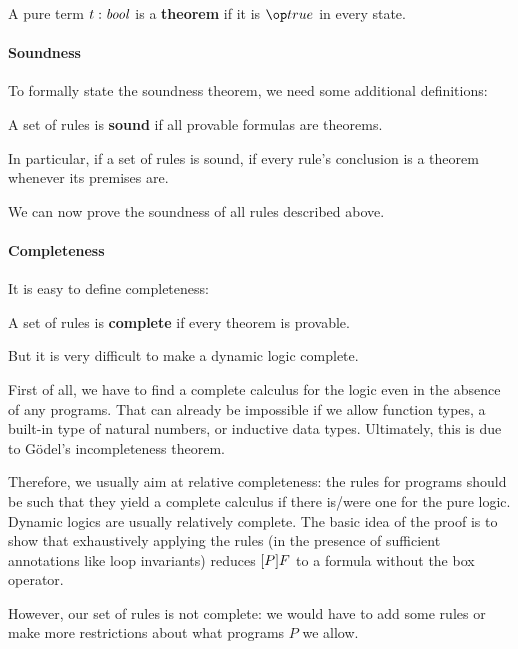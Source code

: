 \begin{definition}[Theorem]
A pure term $t:\mathit{bool}$ is a \textbf{theorem} if it is $\true$ in every state.
\end{definition}


\paragraph{Soundness}
To formally state the soundness theorem, we need some additional definitions:

\begin{definition}[Soundness]
A set of rules is \textbf{sound} if all provable formulas are theorems.
\end{definition}

In particular, if a set of rules is sound, if every rule's conclusion is a theorem whenever its premises are.

We can now prove the soundness of all rules described above.

\paragraph{Completeness}

It is easy to define completeness:

\begin{definition}[Completeness]
A set of rules is \textbf{complete} if every theorem is provable.
\end{definition}

But it is very difficult to make a dynamic logic complete.

First of all, we have to find a complete calculus for the logic even in the absence of any programs.
That can already be impossible if we allow function types, a built-in type of natural numbers, or inductive data types.
Ultimately, this is due to G\"odel's incompleteness theorem.

Therefore, we usually aim at relative completeness: the rules for programs should be such that they yield a complete calculus if there is/were one for the pure logic.
Dynamic logics are usually relatively complete.
The basic idea of the proof is to show that exhaustively applying the rules (in the presence of sufficient annotations like loop invariants) reduces $[P]F$ to a formula without the box operator.

However, our set of rules is not complete: we would have to add some rules or make more restrictions about what programs $P$ we allow.

